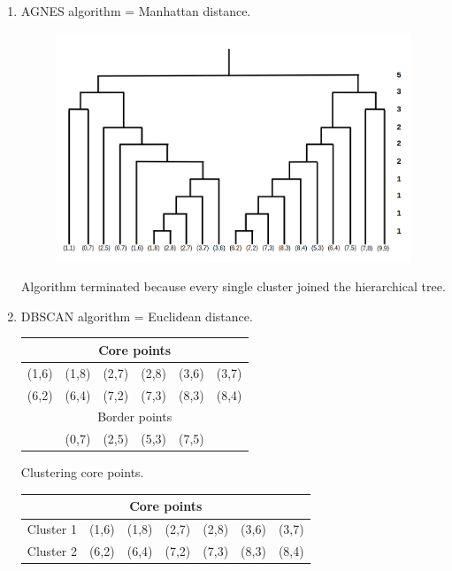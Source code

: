 \documentclass[10pt,a4paper]{article}
\begin{document}
\begin{enumerate}
			
		\clearpage
		\item AGNES algorithm \newline
			 = Manhattan distance. \newline
			\begin{figure}[h!]
				\centering
				\includegraphics[scale=0.27]{agnes.png}
			\end{figure}
		
			Algorithm terminated because every single cluster joined the hierarchical tree.
		
		
		\clearpage
		\item DBSCAN algorithm \newline
			 = Euclidean distance. \newline
			\begin{table}[h!]
				\centering
				\begin{tabular}{cccccc}
					\toprule
					\multicolumn{6}{c}{Core points} \\ \midrule
					(1,6) & (1,8) & (2,7) & (2,8) & (3,6) & (3,7) \\
					(6,2) & (6,4) & (7,2) & (7,3) & (8,3) & (8,4) \\ \hline \hline
					\multicolumn{6}{c}{Border points} \\ \midrule
					& (0,7) & (2,5) & (5,3) & (7,5) & \\
					\bottomrule
				\end{tabular}
			\end{table}
			
			Clustering core points.
			
			\begin{table}[h!]
				\centering
				\begin{tabular}{c|cccccc}
					\toprule
					\multicolumn{7}{c}{Core points} \\ \midrule
					Cluster 1 & (1,6) & (1,8) & (2,7) & (2,8) & (3,6) & (3,7) \\
					Cluster 2 & (6,2) & (6,4) & (7,2) & (7,3) & (8,3) & (8,4) \\ 
					\bottomrule
				\end{tabular}
			\end{table}
		

\end{enumerate}
\end{document}
